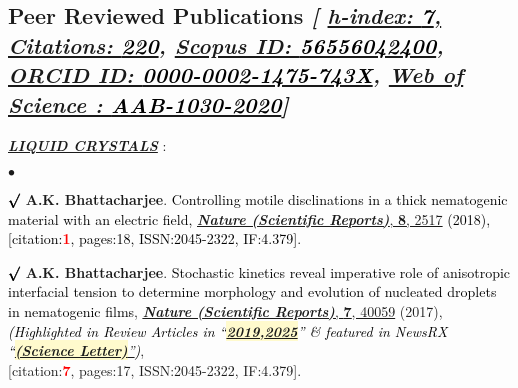 \documentclass[margin,line]{res}
\newenvironment{list1}{
  \begin{list}{\ding{113}}{%
      \setlength{\itemsep}{0in}
      \setlength{\parsep}{0in} \setlength{\parskip}{0in}
      \setlength{\topsep}{0in} \setlength{\partopsep}{0in} 
      \setlength{\leftmargin}{0.17in}}}{\end{list}}
\newenvironment{list2}{
  \begin{list}{$\bullet$}{%
      \setlength{\itemsep}{0in}
      \setlength{\parsep}{0in} \setlength{\parskip}{0in}
      \setlength{\topsep}{0in} \setlength{\partopsep}{0in} 
      \setlength{\leftmargin}{0.2in}}}{\end{list}}
\begin{document}
\begin{resume}
\section{\sc Peer Reviewed Publications {\it [
\href{https://scholar.google.co.uk/citations?user=IE-ZhScAAAAJ}{h-index: \textcolor{black}{\bf 7}, 
Citations: \textcolor{black}{\bf 220}}, 
\href{https://www.scopus.com/authid/detail.uri?authorId=56556042400}{Scopus ID: \textcolor{black}{\bf 56556042400}}, 
\href{http://orcid.org/0000-0002-1475-743X}{ORCID ID: \textcolor{black}{\bf 0000-0002-1475-743X}}, 
\href{https://publons.com/researcher/3324830/amit-kumar-bhattacharjee}{Web of Science : \textcolor{black}{\bf AAB-1030-2020}}]}}
\begin{list1}
\item[] \textcolor{alizarin}{\ul{\textbf{\textit{LIQUID CRYSTALS}}} :}
\end{list1}
\vspace{2mm}
\begin{list2}
\item[$\pmb\surd$] {\bf A.K. Bhattacharjee}. \textcolor{black}{\textsf{Controlling motile disclinations in a thick  
nematogenic material with an electric field}, \href{https://www.nature.com/articles/s41598-018-19891-0}{\underline{\textbf{\textit{Nature 
(Scientific Reports)}}}, {\bf 8}, 2517} (2018), \\{[citation:\textcolor{red}{\bf 1}, pages:18, ISSN:2045-2322, IF:4.379]}}. 
\vspace{4mm}
\item[$\pmb\surd$] {\bf A.K. Bhattacharjee}. \textcolor{black}{\textsf{Stochastic kinetics reveal imperative role of anisotropic interfacial 
tension to determine morphology and evolution of nucleated droplets in nematogenic films}}, \href{https://www.nature.com/articles/srep40059}{\underline{\textit{\textbf{Nature (Scientific Reports)}}}, {\bf 7}, 40059} (2017),
\textcolor{black}{\small \it(Highlighted in Review Articles in ``\href{http://www.tandfonline.com/doi/abs/10.1080/02678292.2016.1239772}{\colorbox{lemonchiffon}{\bf 2019,}}\href{https://iopscience.iop.org/article/10.1088/1361-6633/adb441/meta}{\colorbox{lemonchiffon}{\bf 2025}}'' \& featured in NewsRX 
``\href{http://info.newsrx.com/hubfs/Corresponding\ Author\ Email\ Campaigns/Science\ Letter\ 02.03.17.pdf}{\colorbox{lemonchiffon}{\bf (Science Letter)}''})}, \\{[citation:\textcolor{red}{\bf 7}, pages:17, ISSN:2045-2322, IF:4.379]}.  

\end{list2}
\end{resume}
\end{document}
